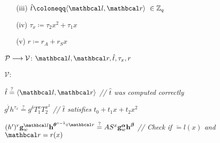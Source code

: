 \begin{mdframed}
\begin{itemize}[itemsep=4pt]
\begin{enumerate}[itemsep=5pt]
        \item[(iii)] $\hat{t} \coloneqq \langle \lvec, \rvec \rangle \ \in \Z_q$
        
        \item[(iv)] $\tau_x \coloneqq \tau_2x^2 + \tau_1x$
        
        \item[(v)] $r \coloneqq r_A + r_Sx$
        
    \end{enumerate}
    
    \item[] $\mathcal{P} \longrightarrow \mathcal{V}$: $\lvec, \rvec, \hat{t}, \tau_x, r$
    
    \item[] $\mathcal{V}$: 
    \begin{enumerate}[itemsep=5pt]
        $\hat{t} \stackrel{?}{=} \langle \lvec, \rvec \rangle$ \hfill{{\small \textit{// $\hat{t}$ was computed correctly}}}

        $g^{\hat{t}}h^{\tau_x} \stackrel{?}{=} g^{\delta} T_1^{x} T_2^{x^2}$ \hfill{{\small \textit{// $\hat{t}$ satisfies $t_0 + t_1x + t_2x^2$}}} 

        $(h^{\prime})^{r} \textbf{g}^{\lvec}_w \textbf{h}^{\vecnb{\theta}^{\circ -1} \circ \rvec} \stackrel{?}{=} AS^{x} \textbf{g}^{\vecnb{\alpha}}_w \textbf{h}^{\vecnb{\beta}}$ \hfill{{\small \textit{// Check if $\lvec = l(x)$ and $\rvec = r(x)$}}}
        
    \end{enumerate}
  
  \end{itemize}
\end{mdframed}


  


